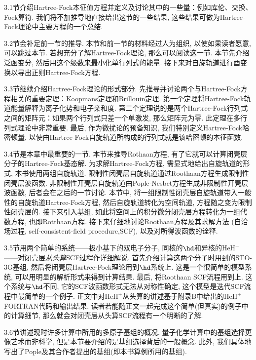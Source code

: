 3.1节介绍Hartree-Fock本征值方程并定义及讨论其中的一些量：例如库伦、交换、Fock算符. 
我们将不加推导地直接给出这节的一些结果, 这些结果可做为Hartree-Fock理论中主要方程的一个总结.

3.2节会补足前一节的推导. 本节和前一节的材料经过人为组织, 以使如果读者愿意, 可以跳过本节. 
若想充分了解Hartree-Fock理论, 那么可以阅读这一节. 本节先介绍泛函变分, 然后用这个级数来最小化单行列式的能量. 
接下来对自旋轨道进行酉变换以导出正则Hartree-Fock方程.

3.3节继续介绍Hartree-Fock理论的形式部分. 
先推导并讨论两个与Hartree-Fock方程相关的重要定理：Koopmans定理和Brillouin定理.
第一个定理将Hartree-Fock轨道能量解释为离子化势和电子亲和度. 
第二个定理说的是两个Hartree-Fock行列式之间的矩阵元：如果两个行列式只差一个单激发, 那么矩阵元为零. 
此定理在多行列式理论中非常重要. 
最后, 作为微扰论的预备知识, 
我们特别定义Hartree-Fock哈密顿量,
以使由Hartree-Fock自旋轨道所构成的行列式就是该哈密顿的本征函数.

3.4节是本章中最重要的一节. 
本节来推导Rothaan方程, 
有了它就可以计算闭壳层分子的Hartree-Fock基态解. 
为求解Hartree-Fock方程, 
需显式地给出自旋轨道的形式, 
本书使用两组自旋轨道.
限制性闭壳层自旋轨道通过Roothaan方程生成限制性闭壳层波函数. 
非限制性开壳层自旋轨道由Pople-Nesbet方程生成非限制性开壳层波函数, 
后者会在之后的一节讨论. 
本节中, 将一组限制性闭壳层自旋轨道带入一般性的自旋轨道Hartree-Fock方程, 
然后自旋轨道转化为空间轨道, 
方程随之变为限制性闭壳层的. 
接下来引入基组, 
如此将空间上的积分微分闭壳层\hft 方程转化为一组代数方程, 
也即Rotthaan方程.
接下来仔细地讨论Roothaan方程及其求解方法
(自洽场过程, self-consistent-field procedure,SCF), 
以及对所得波函数的诠释.

3.5节用两个简单的系统——极小基下的双电子分子, 同核的$\hd$和异核的$\mathrm{HeH}^+$——对闭壳层\emph{从头算}SCF过程作详细解说. 
首先介绍计算这两个分子时用到的STO-3G基组, 然后将闭壳层Hartree-Fock理论用到$\hd$系统上. 
这是一个很简单的模型系统, 可以用明显的解析形式来得到计算结果. 
最后, 将Roothaan SCF流程用到上. 
这个系统与$\hd$不同, 它的SCF波函数形式无法从对称性确定, 
这个模型是迭代SCF流程中最简单的一个例子. 
正文中对$\mathrm{HeH}^+$从头算的讲述基于附录B中给出的$\mathrm{HeH}^+$FORTRAN代码和输出结果. 
读者若能随正文一起完成这个简单(但真实)的例子中的计算细节, 那么就会对闭壳层从头算SCF流程有一个明晰的了解.

3.6节讲述现时许多计算中所用的多原子基组的概况. 
量子化学计算中的基组选择更像艺术而非科学, 
但是本节要介绍的是基组选择背后的一般概念. 
此外, 我们具体地写出了Pople及其合作者提出的基组(即本书算例所用的基组).  

